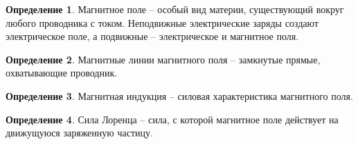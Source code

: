 \documentclass[12pt]{article}
\theoremstyle{definition}
\newtheorem{definition}{Определение}
\begin{document}
\begin{definition}
    Магнитное поле -- особый вид материи, существующий вокруг любого проводника с током. Неподвижные электрические заряды создают электрическое поле, а подвижные -- электрическое и магнитное поля.
\end{definition}
\begin{definition}
    Магнитные линии магнитного поля -- замкнутые прямые, охватывающие проводник.
\end{definition}
\begin{definition}
    Магнитная индукция -- силовая характеристика магнитного поля.
\end{definition}
\begin{center}
\end{center}
\begin{definition}
    Сила Лоренца -- сила, с которой магнитное поле действует на движущуюся заряженную частицу.
\end{definition}
\end{document}
